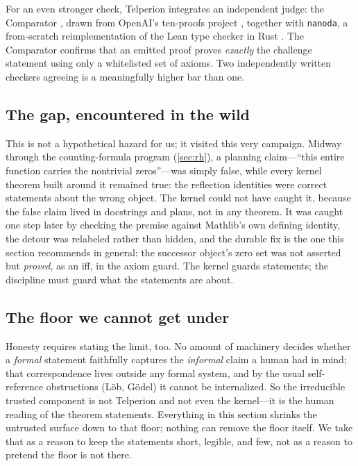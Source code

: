 For an even stronger check, Telperion integrates an independent judge: the
Comparator \cite{comparator}, drawn from OpenAI's ten-proofs project
\cite{tenproofs}, together with \texttt{nanoda}, a from-scratch reimplementation
of the Lean type checker in Rust \cite{nanoda}. The Comparator confirms that an
emitted proof proves \emph{exactly} the challenge statement using only a
whitelisted set of axioms. Two independently written checkers agreeing is a
meaningfully higher bar than one.

\subsection{The gap, encountered in the wild}

This is not a hypothetical hazard for us; it visited this very campaign. Midway
through the counting-formula program (\cref{sec:rh}), a planning claim---``this
entire function carries the nontrivial zeros''---was simply false, while every
kernel theorem built around it remained true: the reflection identities were
correct statements about the wrong object. The kernel could not have caught it,
because the false claim lived in docstrings and plans, not in any theorem. It
was caught one step later by checking the premise against Mathlib's own
defining identity, the detour was relabeled rather than hidden, and the durable
fix is the one this section recommends in general: the successor object's zero
set was not asserted but \emph{proved}, as an iff, in the axiom guard. The
kernel guards statements; the discipline must guard what the statements are
about.

\subsection{The floor we cannot get under}

Honesty requires stating the limit, too. No amount of machinery decides whether a
\emph{formal} statement faithfully captures the \emph{informal} claim a human had
in mind; that correspondence lives outside any formal system, and by the usual
self-reference obstructions (L\"ob, G\"odel) it cannot be internalized. So the
irreducible trusted component is not Telperion and not even the kernel---it is the
human reading of the theorem statements. Everything in this section shrinks the
untrusted surface down to that floor; nothing can remove the floor itself. We
take that as a reason to keep the statements short, legible, and few, not as a
reason to pretend the floor is not there.
